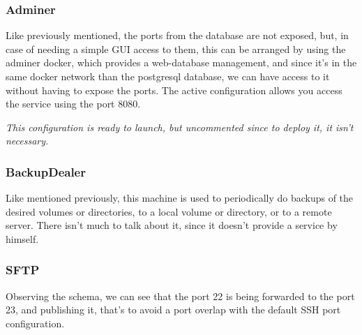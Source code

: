 \documentclass[11pt]{article}
\begin{document}
    \subsubsection[Adminer]{Adminer}
    \begin{flushleft}
        Like previously mentioned, the ports from the database are not exposed, but, in case of needing a simple GUI
        access to them, this can be arranged by using the adminer docker, which provides a web-database management,
        and since it's in the same docker network than the postgresql database, we can have access to it without having
        to expose the ports.
        The active configuration allows you access the service using the port 8080.
    \end{flushleft}

    \begin{flushleft}
        \textit{This configuration is ready to launch, but uncommented since to deploy it, it isn't necessary.}
    \end{flushleft}

    \subsubsection[Backup\_dealer]{BackupDealer}
    \begin{flushleft}
       Like mentioned previously, this machine is used to periodically do backups of the desired volumes or directories,
       to a local volume or directory, or to a remote server.
       There isn't much to talk about it, since it doesn't provide a service by himself.
    \end{flushleft}

    \subsubsection[SFTP]{SFTP}
    \begin{flushleft}
        Observing the schema, we can see that the port 22 is being forwarded to the port 23, and publishing it, that's
        to avoid a port overlap with the default SSH port configuration.
    \end{flushleft}
\end{document}
